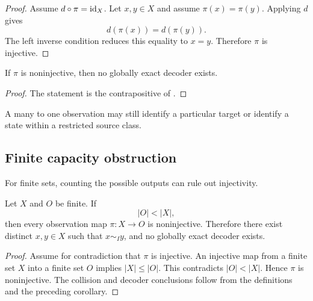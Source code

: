 \begin{proof}
Assume \(d\circ\pi=\operatorname{id}_X\). Let \(x,y\in X\) and assume \(\pi(x)=\pi(y)\). Applying \(d\) gives
\[
d(\pi(x))=d(\pi(y)).
\]
The left inverse condition reduces this equality to \(x=y\). Therefore \(\pi\) is injective.
\end{proof}
\begin{corollary}
If \(\pi\) is noninjective, then no globally exact decoder exists.
\end{corollary}

\begin{proof}
The statement is the contrapositive of .
\end{proof}
A many to one observation may still identify a particular target or identify a state within a restricted source class.

\subsection{Finite capacity obstruction}

For finite sets, counting the possible outputs can rule out injectivity.

\begin{theorem}
Let \(X\) and \(O\) be finite. If
\[
|O|<|X|,
\]
then every observation map \(\pi:X\to O\) is noninjective. Therefore there exist distinct \(x,y\in X\) such that \(x\sim_I y\), and no globally exact decoder exists.
\end{theorem}

\begin{proof}
Assume for contradiction that \(\pi\) is injective. An injective map from a finite set \(X\) into a finite set \(O\) implies \(|X|\leq |O|\). This contradicts \(|O|<|X|\). Hence \(\pi\) is noninjective. The collision and decoder conclusions follow from the definitions and the preceding corollary.
\end{proof}

